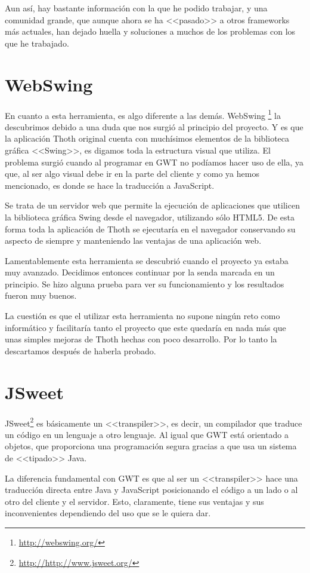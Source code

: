 Aun así, hay bastante información con la que he podido trabajar, y una comunidad grande, que aunque ahora se ha <<pasado>> a otros frameworks más actuales, han dejado huella y soluciones a muchos de los problemas con los que he trabajado.

\section{WebSwing}

En cuanto a esta herramienta, es algo diferente a las demás. WebSwing \footnote{\url{http://webswing.org/}} la descubrimos debido a una duda que nos surgió al principio del proyecto. Y es que la aplicación Thoth original cuenta con muchísimos elementos de la biblioteca gráfica <<Swing>>, es digamos toda la estructura visual que utiliza. El problema surgió cuando al programar en GWT no podíamos hacer uso de ella, ya que, al ser algo visual debe ir en la parte del cliente y como ya hemos mencionado, es donde se hace la traducción a JavaScript. 

Se trata de un servidor web que permite la ejecución de aplicaciones que utilicen la biblioteca gráfica Swing desde el navegador, utilizando sólo HTML5. De esta forma toda la aplicación de Thoth se ejecutaría en el navegador conservando su aspecto de siempre y manteniendo las ventajas de una aplicación web.

Lamentablemente esta herramienta se descubrió cuando el proyecto ya estaba muy avanzado. Decidimos entonces continuar por la senda marcada en un principio. Se hizo alguna prueba para ver su funcionamiento y los resultados fueron muy buenos.

La cuestión es que el utilizar esta herramienta no supone ningún reto como informático y facilitaría tanto el proyecto que este quedaría en nada más que
unas simples mejoras de Thoth hechas con poco desarrollo. Por lo tanto la descartamos después de haberla probado.

\section{JSweet} 

JSweet\footnote{\url{http://http://www.jsweet.org/}} es básicamente un <<transpiler>>, es decir, un compilador que traduce un código en un lenguaje a otro lenguaje. Al igual que GWT está orientado a objetos, que proporciona una programación segura gracias a que usa un sistema de <<tipado>> Java.

La diferencia fundamental con GWT es que al ser un <<transpiler>> hace una traducción directa entre Java y JavaScript posicionando el código a un lado o al otro del cliente y el servidor. Esto, claramente, tiene sus ventajas y sus inconvenientes dependiendo del uso que se le quiera dar. 

